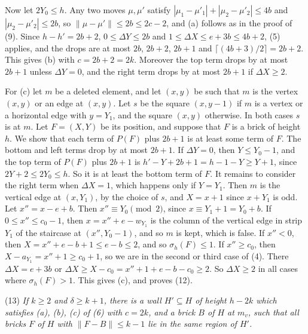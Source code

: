 {Now let $2Y_0 \le h$. Any two moves $\mu, \mu'$ satisfy $|\mu_1 - \mu'_1| + |\mu_2 - \mu'_2| \le 4b$ and $|\mu_2 - \mu'_2| \le 2b$, so $\|\mu - \mu'\| \le 2b \le 2c - 2$, and (a) follows as in the proof of (9). Since $h - h' = 2b + 2$, $0 \le \Delta Y \le 2b$ and $1 \le \Delta X \le e + 3b \le 4b + 2$, (5) applies, and the drops are at most $2b$, $2b + 2$, $2b + 1$ and $\lceil (4b + 3)/2 \rceil = 2b + 2$. This gives (b) with $c = 2b + 2 = 2k$. Moreover the top term drops by at most $2b + 1$ unless $\Delta Y = 0$, and the right term drops by at most $2b + 1$ if $\Delta X \ge 2$.

For (c) let $m$ be a deleted element, and let $(x, y)$ be such that $m$ is the vertex $(x, y)$ or an edge at $(x, y)$. Let $s$ be the square $(x, y - 1)$ if $m$ is a vertex or a horizontal edge with $y = Y_1$, and the square $(x, y)$ otherwise. In both cases $s$ is at $m$. Let $F = (X, Y)$ be its position, and suppose that $F$ is a brick of height $h$. We show that each term of $P(F)$ plus $2b + 1$ is at least some term of $F$. The bottom and left terms drop by at most $2b + 1$. If $\Delta Y = 0$, then $Y \le Y_0 - 1$, and the top term of $P(F)$ plus $2b + 1$ is $h' - Y + 2b + 1 = h - 1 - Y \ge Y + 1$, since $2Y + 2 \le 2Y_0 \le h$. So it is at least the bottom term of $F$. It remains to consider the right term when $\Delta X = 1$, which happens only if $Y = Y_1$. Then $m$ is the vertical edge at $(x, Y_1)$, by the choice of $s$, and $X = x + 1$ since $x + Y_1$ is odd. Let $x'' = x - e + b$. Then $x'' \equiv Y_0 \pmod 2$, since $x \equiv Y_1 + 1 = Y_0 + b$. If $0 \le x'' \le c_0 - 1$, then $x = x'' + e - w_{Y_1}$ is the column of the vertical edge in strip $Y_1$ of the staircase at $(x'', Y_0 - 1)$, and so $m$ is kept, which is false. If $x'' < 0$, then $X = x'' + e - b + 1 \le e - b \le 2$, and so $\sigma_h(F) \le 1$. If $x'' \ge c_0$, then $X - a_{Y_1} = x'' + 1 \ge c_0 + 1$, so we are in the second or third case of (4). There $\Delta X = e + 3b$ or $\Delta X \ge X - c_0 = x'' + 1 + e - b - c_0 \ge 2$. So $\Delta X \ge 2$ in all cases where $\sigma_h(F) > 1$. This gives (c), and proves (12).

\hspace*{12pt}(13) \textit{If $k \ge 2$ and $\delta \ge k + 1$, there is a wall $H' \subseteq H$ of height $h - 2k$ which satisfies (a), (b), (c) of (6) with $c = 2k$, and a brick $B$ of $H$ at $m_v$, such that all bricks $F$ of $H$ with $\|F - B\| \le k - 1$ lie in the same region of $H'$.}

}

